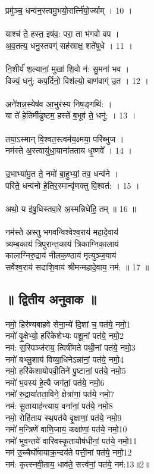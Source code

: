 प्रमु॑ञ्च॒ धन्व॑न॒स्त्वमु॒भयो॒रार्त्नि॑यो॒र्ज्याम् । 10 ।\\
\\
याश्च॑ ते॒ हस्त॒ इष॑व॒: परा॒ ता भ॑गवो वप ।\\
अ॒व॒तत्य॒ धनु॒स्तवग्ं सह॑स्राक्ष॒ शते॑षुधे । 11 । \\
\\
नि॒शीर्य॑ श॒ल्यानां॒ मुखा॑ शि॒वो न॑: सु॒मना॑ भव ।\\
विज्यं॒ धनु॑: कप॒र्दिनो॒ विश॑ल्यो॒ बाण॑वाग्ं उ॒त । 12 ।\\
\\
अने॑शन्न॒स्येष॑व आ॒भुर॑स्य निष॒ङ्गथि॑: ।\\
या ते॑ हे॒तिर्मी॑ढुष्टम॒ हस्ते॑ ब॒भूव॑ ते॒ धनु॑: । 13 ।\\
\\
तया॒ऽस्मान् वि॒श्वत॒स्त्वम॑य॒क्ष्मया॒ परि॑ब्भुज ।\\
नम॑स्ते अ॒स्त्वायु॑धा॒याना॑तताय धृ॒ष्णवे᳚ । 14 ।\\
\\
उ॒भाभ्या॑मु॒त ते॒ नमो॑ बा॒हुभ्यां॒ तव॒ धन्व॑ने ।\\
परि॑ते॒ धन्व॑नो हे॒तिर॒स्मान्वृ॑णक्तु वि॒श्वत॑: । 15 ।\\
\\
अथो॒ य इ॑षु॒धिस्तवा॒रे अ॒स्मन्निधे॑हि॒ तम् ॥ 16 ॥\\
\\
नम॑स्ते अस्तु भगवन्विश्वेश्व॒राय॑ महादे॒वाय॑\\
त्र्यम्ब॒काय॑ त्रिपुरान्त॒काय॑ त्रिकाग्निका॒लाय॑\\
कालाग्निरु॒द्राय॑ नीलक॒ण्ठाय॑ मृत्युञ्ज॒याय॑\\
सर्वेश्व॒राय॑ सदाशि॒वाय॑ श्रीमन्महादे॒वाय॒ नम॑: ॥ 17 ॥\\
\subsection{॥ द्वितीय अनुवाक ॥}
नमो॒ हिर॑ण्यबाहवे सेना॒न्ये॑ दि॒शां च॒ पत॑ये॒ नमो॒{\small 1}\\
नमो॑ वृ॒क्षेभ्यो॒ हरि॑केशेभ्यः पशू॒नां पत॑ये॒ नमो॒{\small 2}\\
नम॑: स॒स्पिञ्ज॑राय॒ त्विषी॑मते पथी॒नां पत॑ये॒ नमो॒{\small 3}\\
नमो॑ बभ्लु॒शाय॑ विव्या॒धिनेऽन्ना॑नां॒ पत॑ये॒ नमो॒{\small 4}\\
नमो॒ हरि॑केशायोपवी॒तिने॑ पु॒ष्टानां॒ पत॑ये॒ नमो॒{\small 5}\\
नमो॑ भ॒वस्य॑ हे॒त्यै जग॑तां॒ पत॑ये॒ नमो॒{\small 6}\\
नमो॑ रु॒द्राया॑तता॒विने॒ क्षेत्रा॑णां॒ पत॑ये॒ नमो॒{\small 7}\\
नम॑: सू॒तायाह॑न्त्याय॒ वना॑नां॒ पत॑ये॒ नमो॒{\small 8}\\
नमो॒ रोहि॑ताय स्थ॒पत॑ये वृ॒क्षाणां॒ पत॑ये॒ नमो॒{\small 9}\\
नमो॑ म॒न्त्रिणे॑ वाणि॒जाय॒ कक्षा॑णां॒ पत॑ये॒ नमो॒{\small 10}\\
नमो॑ भुव॒न्तये॑ वारिवस्कृ॒तायौष॑धीनां॒ पत॑ये॒ नमो॒{\small 11}\\
नम॑ उ॒च्चैर्घो॑षायाक्र॒न्दय॑ते पत्ती॒नां पत॑ये॒ नमो॒{\small 12}\\
नम॑: कृत्स्नवी॒ताय॒ धाव॑ते॒ सत्त्व॑नां॒ पत॑ये॒ नम॑:{\small 13}॥2॥\\
